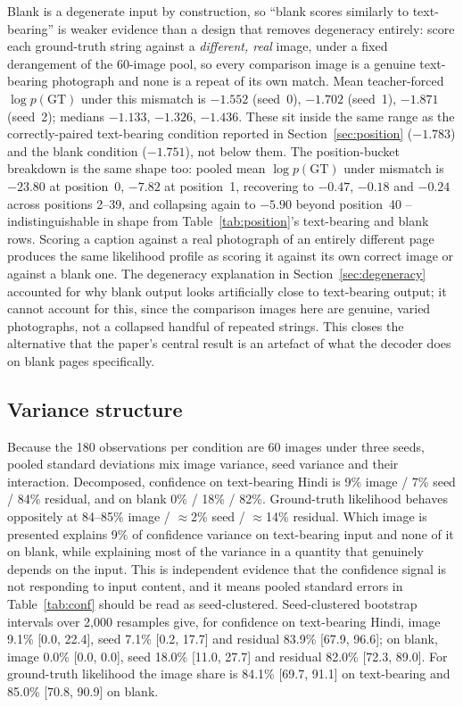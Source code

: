 \documentclass{article}
\begin{document}
Blank is a degenerate input by construction, so ``blank scores similarly to text-bearing'' is
weaker evidence than a design that removes degeneracy entirely: score each ground-truth string
against a \emph{different, real} image, under a fixed derangement of the 60-image pool, so
every comparison image is a genuine text-bearing photograph and none is a repeat of its own
match. Mean teacher-forced $\log p(\mathrm{GT})$ under this mismatch is $-1.552$ (seed~0),
$-1.702$ (seed~1), $-1.871$ (seed~2); medians $-1.133$, $-1.326$, $-1.436$. These sit inside the
same range as the correctly-paired text-bearing condition reported in
Section~\ref{sec:position} ($-1.783$) and the blank condition ($-1.751$), not below them. The
position-bucket breakdown is the same shape too: pooled mean $\log p(\mathrm{GT})$ under
mismatch is $-23.80$ at position~0, $-7.82$ at position~1, recovering to $-0.47$, $-0.18$ and
$-0.24$ across positions 2--39, and collapsing again to $-5.90$ beyond position~40 --
indistinguishable in shape from Table~\ref{tab:position}'s text-bearing and blank rows. Scoring
a caption against a real photograph of an entirely different page produces the same
likelihood profile as scoring it against its own correct image or against a blank one. The
degeneracy explanation in Section~\ref{sec:degeneracy} accounted for why blank output looks
artificially close to text-bearing output; it cannot account for this, since the comparison
images here are genuine, varied photographs, not a collapsed handful of repeated strings. This
closes the alternative that the paper's central result is an artefact of what the decoder does
on blank pages specifically.

\subsection{Variance structure}
\label{sec:variance}

Because the 180 observations per condition are 60 images under three seeds, pooled standard
deviations mix image variance, seed variance and their interaction. Decomposed, confidence on
text-bearing Hindi is 9\% image / 7\% seed / 84\% residual, and on blank 0\% / 18\% / 82\%.
Ground-truth likelihood behaves oppositely at 84--85\% image / $\approx$2\% seed /
$\approx$14\% residual. Which image is presented explains 9\% of confidence variance on text-bearing
input and none of it on blank, while explaining most of the variance in a quantity that
genuinely depends on the input. This is independent evidence that the confidence signal is not
responding to input content, and it means pooled standard errors in Table~\ref{tab:conf}
should be read as seed-clustered. Seed-clustered bootstrap intervals over 2{,}000 resamples
give, for confidence on text-bearing Hindi, image 9.1\% [0.0, 22.4], seed 7.1\% [0.2, 17.7] and
residual 83.9\% [67.9, 96.6]; on blank, image 0.0\% [0.0, 0.0], seed 18.0\% [11.0, 27.7] and
residual 82.0\% [72.3, 89.0]. For ground-truth likelihood the image share is 84.1\%
[69.7, 91.1] on text-bearing and 85.0\% [70.8, 90.9] on blank.
\end{document}
